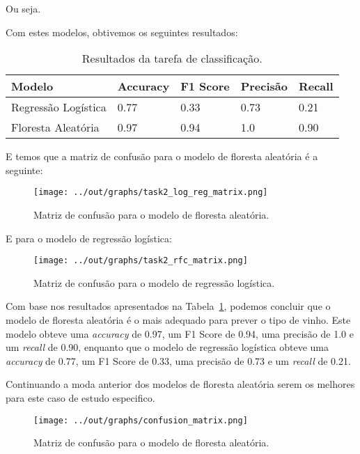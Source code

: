 \documentclass{article}
\begin{document}
Ou seja.

Com estes modelos, obtivemos os seguintes resultados:

\begin{table}[ht]
  \centering
  \begin{tabular}{@{}lllll@{}}
    \toprule
    Modelo & Accuracy & F1 Score & Precisão & Recall \\ \midrule
    Regressão Logística & 0.77 & 0.33 & 0.73 & 0.21 \\
    Floresta Aleatória & 0.97 & 0.94 & 1.0 & 0.90 \\ \bottomrule
  \end{tabular}
  \caption{Resultados da tarefa de classificação.}
  \label{tab:task2_results}
\end{table}

E temos que a matriz de confusão para o modelo de floresta aleatória é a seguinte:

\begin{figure}[ht]
  \centering
  \texttt{[image: ../out/graphs/task2\_log\_reg\_matrix.png]}
  \caption{Matriz de confusão para o modelo de floresta aleatória.}
  \label{fig:task2_confusion_matrix}
\end{figure}

E para o modelo de regressão logística:

\begin{figure}[ht]
  \centering
  \texttt{[image: ../out/graphs/task2\_rfc\_matrix.png]}
  \caption{Matriz de confusão para o modelo de regressão logística.}
  \label{fig:task2_confusion_matrix}
\end{figure}

Com base nos resultados apresentados na Tabela~\ref{tab:task2_results}, podemos concluir que o modelo de floresta aleatória é o mais adequado para prever o tipo de vinho. Este modelo obteve uma \textit{accuracy} de 0.97, um F1 Score de 0.94, uma precisão de 1.0 e um \textit{recall} de 0.90, enquanto que o modelo de regressão logística obteve uma \textit{accuracy} de 0.77, um F1 Score de 0.33, uma precisão de 0.73 e um \textit{recall} de 0.21.

Continuando a moda anterior dos modelos de floresta aleatória serem os melhores para este caso de estudo especifico.

\begin{figure}[ht]
  \centering
  \texttt{[image: ../out/graphs/confusion\_matrix.png]}
  \caption{Matriz de confusão para o modelo de floresta aleatória.}
  \label{fig:task2_confusion_matrix}
\end{figure}
\end{document}
